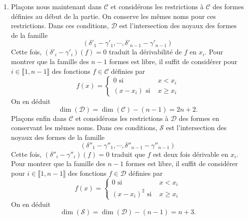 \begin{enumerate}
  \item Plaçons nous maintenant dans $\mathcal{C}$ et considérons les restrictions à $\mathcal{C}$ des formes définies au début de la partie. On conserve les mêmes noms pour ces restrictions.\newline
Dans ces conditions, $\mathcal{D}$ est l'intersection des noyaux des formes de la famille
\begin{displaymath}
  \left( \delta'_1 - \gamma'_1, \cdots, \delta'_{n-1} - \gamma'_{n-1}\right) 
\end{displaymath}
Cette fois, $(\delta'_i - \gamma'_i)(f)=0$ traduit la dérivabilité de $f$ en $x_i$. Pour montrer que la famille des $n-1$ formes est libre, il suffit de considérer pour $i\in \llbracket 1,n-1\rrbracket$ des fonctions $f\in \mathcal{C}$ définies par 
\begin{displaymath}
  f(x)=
\left\lbrace 
\begin{aligned}
  0 \text{ si }& x < x_i \\ (x-x_i) \text{ si }& x \geq x_i
\end{aligned}
\right. 
\end{displaymath}
On en déduit 
\begin{displaymath}
  \dim(\mathcal{D}) = \dim(\mathcal{C}) - (n-1) = 2n +2.
\end{displaymath}
Plaçons enfin dans $\mathcal{C}$ et considérons les restrictions à $\mathcal{D}$ des formes en conservant les mêmes noms.\newline
Dans ces conditions, $\mathcal{S}$ est l'intersection des noyaux des formes de la famille
\begin{displaymath}
  \left( \delta''_1 - \gamma''_1, \cdots, \delta''_{n-1} - \gamma''_{n-1}\right) 
\end{displaymath}
Cette fois, $(\delta''_i - \gamma''_i)(f)=0$ traduit que $f$ est deux fois dérivable en $x_i$. Pour montrer que la famille des $n-1$ formes est libre, il suffit de considérer pour $i\in \llbracket 1,n-1\rrbracket$ des fonctions $f\in \mathcal{D}$ définies par 
\begin{displaymath}
  f(x)=
\left\lbrace 
\begin{aligned}
  0 \text{ si }& x < x_i \\ (x-x_i)^2 \text{ si }& x \geq x_i
\end{aligned}
\right. 
\end{displaymath}
On en déduit 
\begin{displaymath}
  \dim(\mathcal{S}) = \dim(\mathcal{D}) - (n-1) = n + 3.
\end{displaymath}
\end{enumerate}

